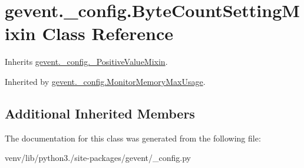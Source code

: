 \hypertarget{classgevent_1_1__config_1_1_byte_count_setting_mixin}{}\section{gevent.\+\_\+config.\+Byte\+Count\+Setting\+Mixin Class Reference}
\label{classgevent_1_1__config_1_1_byte_count_setting_mixin}


Inherits \hyperlink{classgevent_1_1__config_1_1___positive_value_mixin}{gevent.\+\_\+config.\+\_\+\+Positive\+Value\+Mixin}.



Inherited by \hyperlink{classgevent_1_1__config_1_1_monitor_memory_max_usage}{gevent.\+\_\+config.\+Monitor\+Memory\+Max\+Usage}.

\subsection*{Additional Inherited Members}


The documentation for this class was generated from the following file\+:\begin{DoxyCompactItemize}
\item 
venv/lib/python3./site-\/packages/gevent/\+\_\+config.\+py\end{DoxyCompactItemize}

